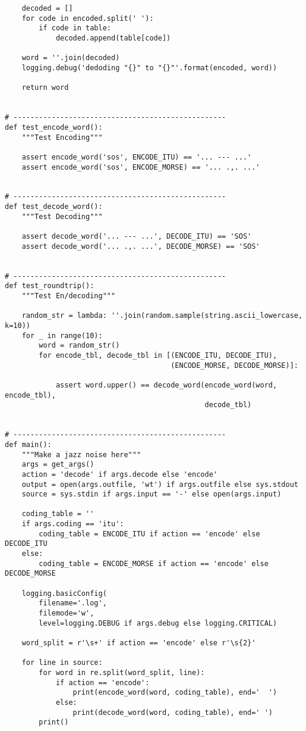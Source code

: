 \documentclass[]{article}
\begin{document}
\begin{verbatim}
    decoded = []
    for code in encoded.split(' '):
        if code in table:
            decoded.append(table[code])

    word = ''.join(decoded)
    logging.debug('dedoding "{}" to "{}"'.format(encoded, word))

    return word


# --------------------------------------------------
def test_encode_word():
    """Test Encoding"""

    assert encode_word('sos', ENCODE_ITU) == '... --- ...'
    assert encode_word('sos', ENCODE_MORSE) == '... .,. ...'


# --------------------------------------------------
def test_decode_word():
    """Test Decoding"""

    assert decode_word('... --- ...', DECODE_ITU) == 'SOS'
    assert decode_word('... .,. ...', DECODE_MORSE) == 'SOS'


# --------------------------------------------------
def test_roundtrip():
    """Test En/decoding"""

    random_str = lambda: ''.join(random.sample(string.ascii_lowercase, k=10))
    for _ in range(10):
        word = random_str()
        for encode_tbl, decode_tbl in [(ENCODE_ITU, DECODE_ITU),
                                       (ENCODE_MORSE, DECODE_MORSE)]:

            assert word.upper() == decode_word(encode_word(word, encode_tbl),
                                               decode_tbl)


# --------------------------------------------------
def main():
    """Make a jazz noise here"""
    args = get_args()
    action = 'decode' if args.decode else 'encode'
    output = open(args.outfile, 'wt') if args.outfile else sys.stdout
    source = sys.stdin if args.input == '-' else open(args.input)

    coding_table = ''
    if args.coding == 'itu':
        coding_table = ENCODE_ITU if action == 'encode' else DECODE_ITU
    else:
        coding_table = ENCODE_MORSE if action == 'encode' else DECODE_MORSE

    logging.basicConfig(
        filename='.log',
        filemode='w',
        level=logging.DEBUG if args.debug else logging.CRITICAL)

    word_split = r'\s+' if action == 'encode' else r'\s{2}'

    for line in source:
        for word in re.split(word_split, line):
            if action == 'encode':
                print(encode_word(word, coding_table), end='  ')
            else:
                print(decode_word(word, coding_table), end=' ')
        print()



\end{verbatim}
\end{document}
